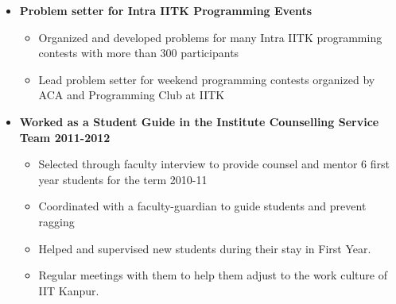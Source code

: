 \documentclass[margin,line]{resume}
\begin{document}
\begin{resume}
\begin{itemize}
  \item \textbf{\textsf{Problem setter for Intra IITK Programming Events}}
    \begin{itemize}
    \item Organized and developed problems for many Intra IITK programming contests with more than 300 participants
    \item Lead problem setter for weekend programming contests organized by ACA and Programming Club at IITK
    \end{itemize}

  \item \textbf{\textsf Worked as a Student Guide in the Institute Counselling Service Team 2011-2012}
    \begin{itemize}
    \item Selected through faculty interview to provide counsel and mentor 6 first year students for the term 2010-11
    \item Coordinated with a faculty-guardian to guide students and prevent ragging
    \item Helped and supervised new students during their stay in First Year.
    \item Regular meetings with them to help them adjust to the work culture of IIT Kanpur.
    \end{itemize}

    


\end{itemize}
\end{resume}
\end{document}
